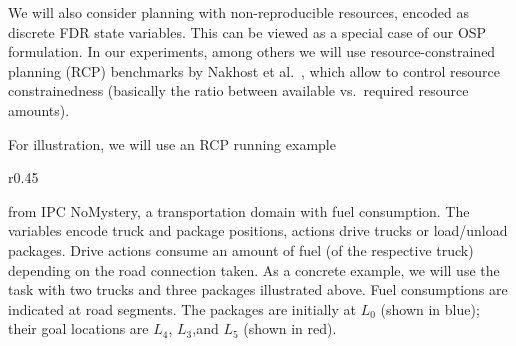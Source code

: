 %
%
We will also consider planning with non-reproducible resources,
encoded as discrete FDR state variables. This can be viewed as a
special case of our OSP formulation. In our experiments, among others
we will use resource-constrained planning (RCP) benchmarks by Nakhost
et al.\ , which allow to control
resource constrainedness (basically the ratio between available
vs.\ required resource amounts).

For illustration, we will use an RCP running example 
%
\begin{wrapfigure}{r}{0.45\columnwidth}
\vspace{-0.3cm} \hspace{-0.8cm} %
\vspace{-0.5cm}
\end{wrapfigure}
%
from IPC NoMystery, a transportation domain with fuel consumption.
The variables encode truck and package positions, actions drive trucks
or load/unload packages. Drive actions consume an amount of fuel (of
the respective truck) depending on the road connection taken. As a
concrete example, we will use the task with two trucks and three
packages illustrated above. Fuel consumptions are indicated at road
segments. The packages are initially at $L_0$ (shown in blue); their
goal locations are $L_4$, $L_3$,and $L_5$ (shown in red).
